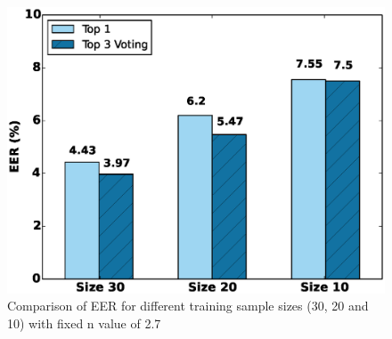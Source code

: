\begin{figure}[t]
\centering
\includegraphics [width=\columnwidth]{figure/exp2_vary_size.eps}
\caption{Comparison of EER for different training sample sizes (30, 20 and 10)
with fixed n value of 2.7}
\label{fig:eer-size}
\end{figure}





